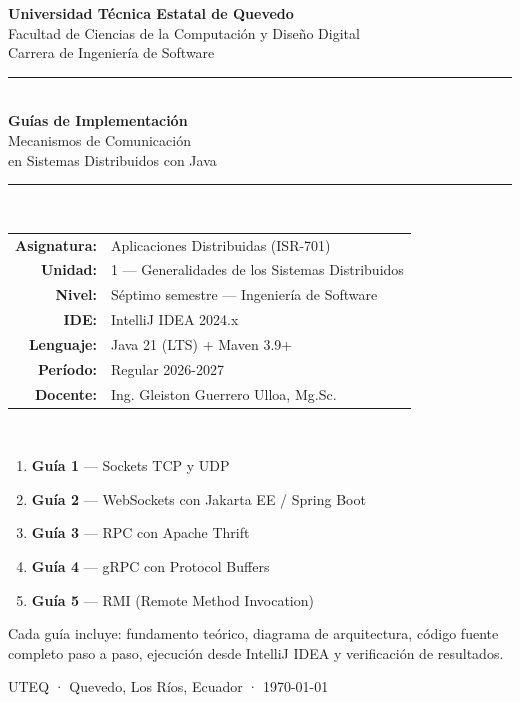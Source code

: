 \documentclass[12pt, a4paper, openany]{book}
\newcounter{paso}[section]
\begin{document}
	
	\begin{titlepage}
		\centering
		{\large \textbf{Universidad Técnica Estatal de Quevedo}}\\[0.3em]
		{\normalsize Facultad de Ciencias de la Computación y Diseño Digital}\\
		{\normalsize Carrera de Ingeniería de Software}\\[2em]
		
		\rule{\linewidth}{1.5pt}\\[0.6em]
		{\LARGE \textbf{Guías de Implementación}}\\[0.4em]
		{\Large Mecanismos de Comunicación\\en Sistemas Distribuidos con Java}\\[0.4em]
		\rule{\linewidth}{1.5pt}\\[1.5em]
		
		{\large
			\begin{tabular}{rl}
				\textbf{Asignatura:}  & Aplicaciones Distribuidas (ISR-701)\\[0.3em]
				\textbf{Unidad:}      & 1 — Generalidades de los Sistemas Distribuidos\\[0.3em]
				\textbf{Nivel:}       & Séptimo semestre — Ingeniería de Software\\[0.3em]
				\textbf{IDE:}         & IntelliJ IDEA 2024.x\\[0.3em]
				\textbf{Lenguaje:}    & Java 21 (LTS) + Maven 3.9+\\[0.3em]
				\textbf{Período:}     & Regular 2026-2027\\[0.3em]
				\textbf{Docente:}     & Ing. Gleiston Guerrero Ulloa, Mg.Sc.\\
			\end{tabular}
		}\\[2em]
		
		\begin{tcolorbox}[colback=uteqLight, colframe=uteqGreen,
			fonttitle=\bfseries\color{white}, title={Contenido de este documento},
			arc=4pt, boxrule=1pt]
			\begin{enumerate}
				\item \textbf{Guía 1} — Sockets TCP y UDP
				\item \textbf{Guía 2} — WebSockets con Jakarta EE / Spring Boot
				\item \textbf{Guía 3} — RPC con Apache Thrift
				\item \textbf{Guía 4} — gRPC con Protocol Buffers
				\item \textbf{Guía 5} — RMI (Remote Method Invocation)
			\end{enumerate}
			Cada guía incluye: fundamento teórico, diagrama de arquitectura,
			código fuente completo paso a paso, ejecución desde IntelliJ IDEA
			y verificación de resultados.
		\end{tcolorbox}
		
		\vfill
		{\small UTEQ · Quevedo, Los Ríos, Ecuador · \today}
	\end{titlepage}
	
\end{document}
